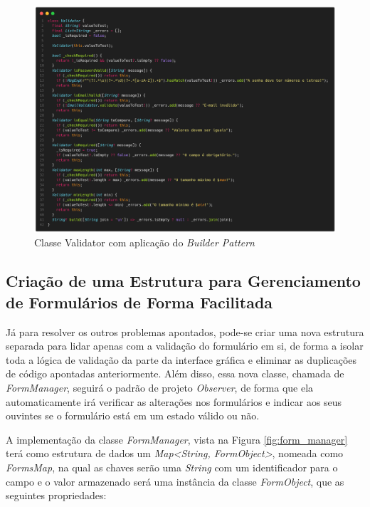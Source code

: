 \documentclass[12pt, %
openright, 
oneside, %
a4paper,    %
brazil]{facom-ufu-abntex2}
\begin{document}
\begin{figure}[ht]
    \centering
    \includegraphics[width=1\textwidth, trim={0 30 0 100}, clip]{figures/forms/form_validator.png}
    \caption{Classe Validator com aplicação do \textit{Builder Pattern}}
    \label{fig:form_validator}
\end{figure}

\subsection{Criação de uma Estrutura para Gerenciamento de Formulários de Forma Facilitada}

Já para resolver os outros problemas apontados, pode-se criar uma nova estrutura separada para lidar apenas com a validação do formulário em si, de forma a isolar toda a lógica de validação da parte da interface gráfica e eliminar as duplicações de código apontadas anteriormente. Além disso, essa nova classe, chamada de \textit{FormManager}, seguirá o padrão de projeto \textit{Observer}, de forma que ela automaticamente irá verificar as alterações nos formulários e indicar aos seus ouvintes se o formulário está em um estado válido ou não.

A implementação da classe \textit{FormManager}, vista na Figura \ref{fig:form_manager} terá como estrutura de dados um \textit{Map<String, FormObject>}, nomeada como \textit{FormsMap}, na qual as chaves serão uma \textit{String} com um identificador para o campo e o valor armazenado será uma instância da classe \textit{FormObject}, que as seguintes propriedades:
\end{document}

